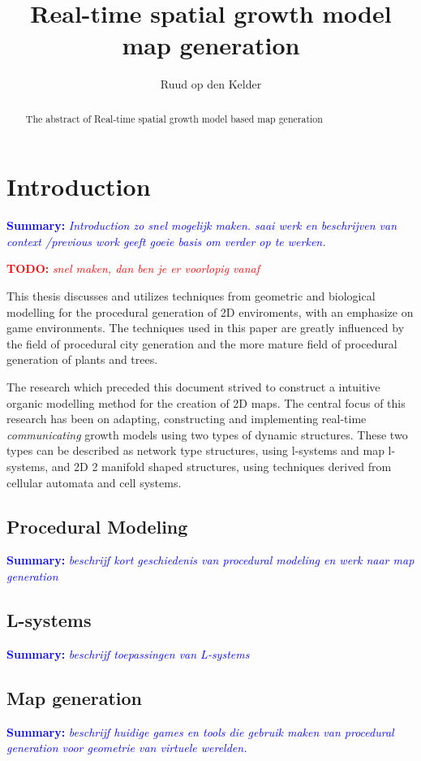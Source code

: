 \documentclass{article}
\title{Real-time spatial growth model map generation}
\author{Ruud op den Kelder}
\newcommand{\todo}[1]{\textcolor{red}{\textbf{TODO: }\it{#1}}}
\newcommand{\inhoud}[1]{\textcolor{blue}{\textbf{Summary: }\it{#1}}}
\begin{document}
\maketitle

\begin{abstract}
The abstract of Real-time spatial growth model based map generation
\end{abstract}
\newpage 

\tableofcontents
\newpage 

\section{Introduction}
\inhoud{Introduction zo snel mogelijk maken. saai werk en beschrijven van context /previous work 
geeft goeie basis om verder op te werken. }

\todo{snel maken, dan ben je er voorlopig vanaf}

This thesis discusses and utilizes techniques from geometric and biological modelling for the procedural generation of 2D enviroments, with an emphasize on game environments. The techniques used in this paper are greatly influenced by the field of procedural city generation and the more mature field of procedural generation of plants and trees. 

The research which preceded this document strived to construct a intuitive organic modelling method for the creation of 2D maps. The central focus of this research has been on adapting, constructing and implementing real-time \emph{communicating} growth models using two types of dynamic structures. These two types can be described as network type structures, using l-systems and map l-systems, and 2D 2 manifold shaped structures, using techniques derived from cellular automata and cell systems.     

\subsection{Procedural Modeling}
\inhoud{beschrijf kort geschiedenis van procedural modeling en werk naar map generation}
\cite{citysurvey}



\subsection{L-systems}
\inhoud{beschrijf toepassingen van L-systems}

\subsection{Map generation}
\inhoud{beschrijf huidige games en tools die gebruik maken van procedural generation voor geometrie van virtuele werelden.}
\end{document}
